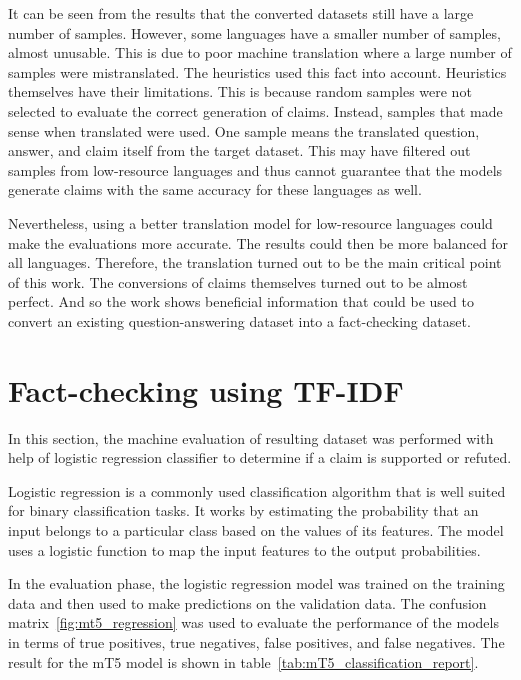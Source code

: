 It can be seen from the results that the converted datasets still have a large number of samples. However, some languages have a smaller number of samples, almost unusable. This is due to poor machine translation where a large number of samples were mistranslated. The heuristics used this fact into account. Heuristics themselves have their limitations. This is because random samples were not selected to evaluate the correct generation of claims. Instead, samples that made sense when translated were used. One sample means the translated question, answer, and claim itself from the target dataset. This may have filtered out samples from low-resource languages and thus cannot guarantee that the models generate claims with the same accuracy for these languages as well.

Nevertheless, using a better translation model for low-resource languages could make the evaluations more accurate. The results could then be more balanced for all languages. Therefore, the translation turned out to be the main critical point of this work. The conversions of claims themselves turned out to be almost perfect. And so the work shows beneficial information that could be used to convert an existing question-answering dataset into a fact-checking dataset.

\section{Fact-checking using TF-IDF}\label{seq:experiments_tfidf}
In this section, the machine evaluation of resulting dataset was performed with help of logistic regression classifier to determine if a claim is supported or refuted.

Logistic regression is a commonly used classification algorithm that is well suited for binary classification tasks. It works by estimating the probability that an input belongs to a particular class based on the values of its features. The model uses a logistic function to map the input features to the output probabilities.

In the evaluation phase, the logistic regression model was trained on the training data and then used to make predictions on the validation data. The confusion matrix~\ref{fig:mt5_regression} was used to evaluate the performance of the models in terms of true positives, true negatives, false positives, and false negatives. The result for the mT5 model is shown in table~\ref{tab:mT5_classification_report}.

